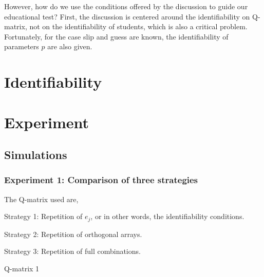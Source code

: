 \documentclass{edm_template}
\begin{document}
However, how do we use the conditions offered by the discussion to guide our educational test? First, the discussion is centered around the identifiability on Q-matrix, not on the identifiability of students, which is also a critical problem\cite{beck2007identifiability}. Fortunately, for the case slip and guess are known, the identifiability of parameters $p$ are also given. 
\section{Identifiability}
\section{Experiment}
\subsection{Simulations}
\subsubsection{Experiment 1: Comparison of three strategies}
   
The Q-matrix used are,

Strategy 1: Repetition of $e_j$, or in other words, the identifiability conditions.

Strategy 2: Repetition of orthogonal arrays.

Strategy 3: Repetition of full combinations.


Q-matrix 1
\end{document}
